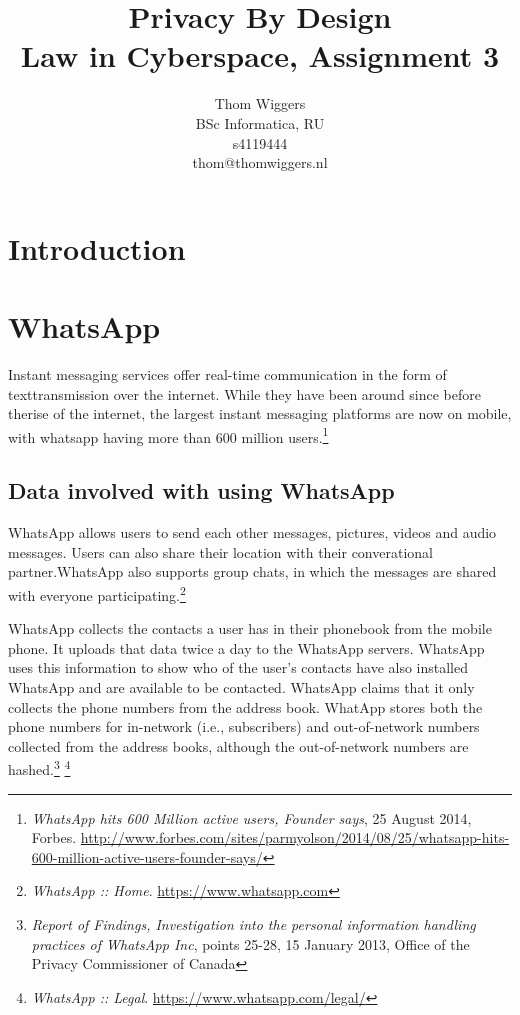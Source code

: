\documentclass{article}
\author{Thom Wiggers\\ \small BSc Informatica, RU \\ \small s4119444 \\ \small thom@thomwiggers.nl }
\title{Privacy By Design\\ {\large Law in Cyberspace, Assignment 3}}
\begin{document}
\maketitle

\section{Introduction}

\section{WhatsApp}

Instant messaging services offer real-time communication in the form of texttransmission over the internet. While they have been around since before therise of the internet, the largest instant messaging platforms are now on mobile, with whatsapp having more than 600 million users.\footnote{\emph{WhatsApp hits 600 Million active users, Founder says}, 25 August 2014, Forbes. \url{http://www.forbes.com/sites/parmyolson/2014/08/25/whatsapp-hits-600-million-active-users-founder-says/}}

\subsection{Data involved with using WhatsApp}

WhatsApp allows users to send each other messages, pictures, videos and audio messages. Users can also share their location with their converational partner.WhatsApp also supports group chats, in which the messages are shared with everyone participating.\footnote{\emph{WhatsApp :: Home}. \url{https://www.whatsapp.com}}

WhatsApp collects the contacts a user has in their phonebook from the mobile phone. It uploads that data twice a day to the WhatsApp servers. WhatsApp uses this information to show who of the user's contacts have also installed WhatsApp and are available to be contacted. WhatsApp claims that it only collects the phone numbers from the address book. WhatApp stores both the phone numbers for in-network (i.e., subscribers) and out-of-network numbers collected from the address books, although the out-of-network numbers are hashed.\footnote{\emph{Report of Findings, Investigation into the personal information handling practices of WhatsApp Inc}, points 25-28, 15 January 2013, Office of the Privacy Commissioner of Canada} \footnote{\emph{WhatsApp :: Legal}. \url{https://www.whatsapp.com/legal/}}
\end{document}
